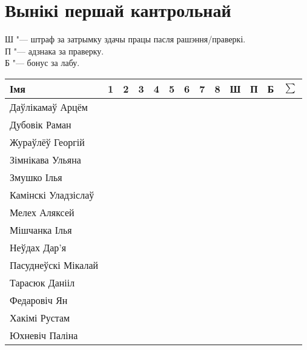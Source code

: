 


	\section{Вынікі першай кантрольнай}
	\noindent Ш "--- штраф за затрымку здачы працы пасля рашэння/праверкі. \\
	П "--- адзнака за праверку. \\
	Б "--- бонус за лабу.
\begin{table}[H]
	\begin{tabular}{|l|c|c|c|c|c|c|c|c|c|c|c|c|}
		\hline
		Імя                 & 1 & 2   & 3   & 4    & 5    & 6 & 7   & 8    & Ш   & П    & Б    & $\sum$ \\ \hline
		Даўлікамаў Арцём & & & & & & & & & & & & \\ \hline
		Дубовік Раман & & & & & & & & & & & & \\ \hline
		Жураўлёў Георгій & & & & & & & & & & & & \\ \hline
		Зімнікава Ульяна & & & & & & & & & & & & \\ \hline
		Змушко Ілья & & & & & & & & & & & & \\ \hline
		Камінскі Уладзіслаў & & & & & & & & & & & & \\ \hline
		Мелех Аляксей & & & & & & & & & & & & \\ \hline
		Мішчанка Ілья & & & & & & & & & & & & \\ \hline
		Неўдах Дар'я & & & & & & & & & & & & \\ \hline
		Пасуднеўскі Мікалай & & & & & & & & & & & & \\ \hline
		Тарасюк Данііл & & & & & & & & & & & & \\ \hline
		Федаровіч Ян & & & & & & & & & & & & \\ \hline
		Хакімі Рустам & & & & & & & & & & & & \\ \hline
		Юхневіч Паліна & & & & & & & & & & & & \\ \hline
	\end{tabular}
\end{table}
	
